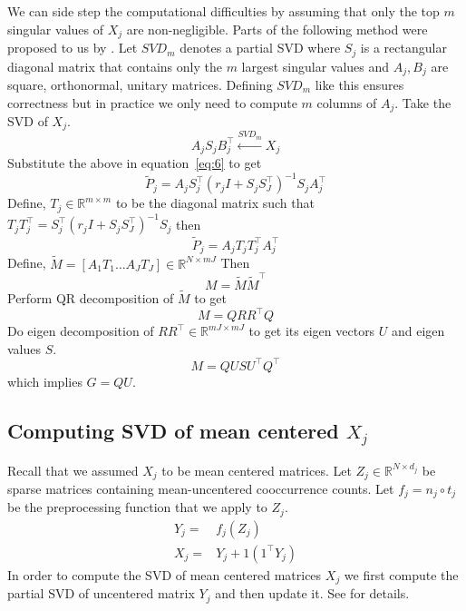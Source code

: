 \documentclass[11pt]{article}
\begin{document}
We can side step the computational difficulties by assuming that only
the top $m$ singular values of $X_j$ are non-negligible. Parts of the
following method were proposed to us by \cite{savostyanov}.
Let $SVD_m$ denotes a partial SVD where $S_j$ is a rectangular diagonal
matrix that contains only the $m$ largest singular values and $A_j, B_j$
are square, orthonormal, unitary matrices. Defining $SVD_m$ like this
ensures correctness but in practice we only need to compute $m$
columns of $A_j$. Take the SVD of $X_j$.
$$A_{j} S_{j} B^\top_{j} \xleftarrow{SVD_{m}} X_j$$
 Substitute the above in equation~\ref{eq:6} to get 
$$\widetilde{P}_j = A_j S_j^\top(r_j I + S_j S_J^\top)^{-1}S_j A_j^\top$$ 
Define, $T_j \in \mathbb{R}^{m \times m}$ to be the diagonal matrix such that
$T_jT_j^\top = S_j^\top(r_j I + S_j S_J^\top)^{-1}S_j $ then
$$\widetilde{P}_j = A_j T_j T_j^\top A_j^\top$$
Define, $\tilde{M} = \left[ A_1T_1 \ldots A_JT_J \right] \in \mathbb{R}^{N
  \times mJ}$
Then 
$$M = \tilde{M} \tilde{M}^\top$$
Perform QR decomposition of $\tilde{M}$ to get
$$M = Q R R^\top Q$$
Do eigen decomposition of $R R^\top \in \mathbb{R}^{mJ \times mJ}$
to get its eigen vectors $U$ and eigen values $S$.
$$M = Q U S U^\top Q^\top$$
 which implies $G = QU$. 

\subsection{Computing SVD of mean centered $X_j$}
\label{ssec:svdmc}
Recall that we assumed $X_j$ to be mean centered matrices. Let $Z_j
\in \mathbb{R}^{N \times d_j}$ be sparse matrices containing
mean-uncentered cooccurrence counts. Let $f_j = n_j \circ t_j $ be the preprocessing
function that we apply to $Z_j$. 
\begin{align}
  Y_j =& f_j (Z_j) \\
  X_j =& Y_j + 1 (1^\top Y_j)
\end{align}
In order to compute the SVD of mean centered matrices $X_j$ we first
compute the partial SVD of uncentered 
matrix $Y_j$ and then update it. See \cite{brand2006fast} for details.
\end{document}
